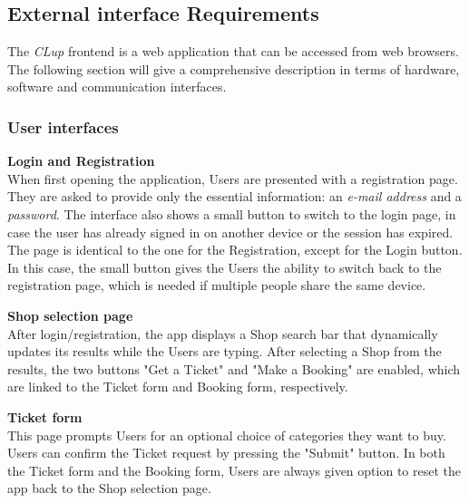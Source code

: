 \subsection{External interface Requirements}
The \emph{CLup} frontend is a web application that can be accessed from web browsers.  The following section will give a comprehensive description in terms of hardware, software and communication interfaces.

\subsubsection{User interfaces}
\textbf{Login and Registration}\\
\label{page:login}
When first opening the application, Users are presented with a registration page. They are asked to provide only the essential information: an \emph{e-mail address} and a \emph{password}. The interface also shows a small button to switch to the login page, in case the user has already signed in on another device or the session has expired. The page is identical to the one for the Registration, except for the Login button. In this case, the small button gives the Users the ability to switch back to the registration page, which is needed if multiple people share the same device.


\textbf{Shop selection page}\\
\label{page:home}
After login/registration, the app displays a Shop search bar that dynamically updates its results while the Users are typing. After selecting a Shop from the results, the two buttons "Get a Ticket" and "Make a Booking" are enabled, which are linked to the Ticket form and Booking form, respectively.

\textbf{Ticket form}\\
\label{page:ticket_form}
This page prompts Users for an optional choice of categories they want to buy. Users can confirm the Ticket request by pressing the "Submit" button. In both the Ticket form and the Booking form, Users are always given option to reset the app back to the Shop selection page.

